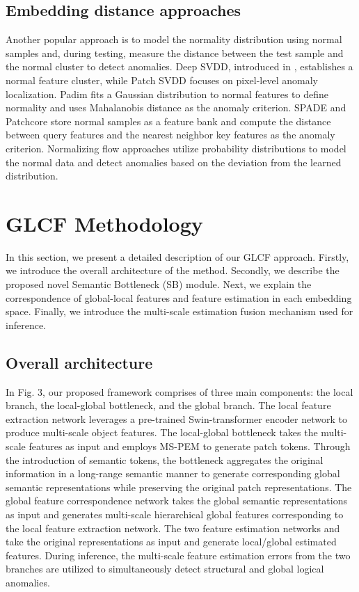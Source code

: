 \documentclass[lettersize,journal]{IEEEtran}
\begin{document}
\subsection{Embedding distance approaches}
Another popular approach is to model the normality distribution using normal samples and, during testing, measure the distance between the test sample and the normal cluster to detect anomalies. Deep SVDD, introduced in \cite{r18}, establishes a normal feature cluster, while Patch SVDD \cite{r19} focuses on pixel-level anomaly localization. Padim \cite{r23} fits a Gaussian distribution to normal features to define normality and uses Mahalanobis distance as the anomaly criterion. SPADE \cite{r21} and Patchcore \cite{r22} store normal samples as a feature bank and compute the distance between query features and the nearest neighbor key features as the anomaly criterion. Normalizing flow approaches \cite{r25, r24} utilize probability distributions to model the normal data and detect anomalies based on the deviation from the learned distribution.

\section{GLCF Methodology}

In this section, we present a detailed description of our GLCF approach. Firstly, we introduce the overall architecture of the method. Secondly, we describe the proposed novel Semantic Bottleneck (SB) module. Next, we explain the correspondence of global-local features and feature estimation in each embedding space. Finally, we introduce the multi-scale estimation fusion mechanism used for inference.



\subsection{Overall architecture}

In Fig. 3, our proposed framework comprises of three main components: the local branch, the local-global bottleneck, and the global branch. The local feature extraction network  leverages a pre-trained Swin-transformer \cite{r30} encoder network to produce multi-scale object features. The local-global bottleneck takes the multi-scale features as input and employs MS-PEM to generate patch tokens. Through the introduction of semantic tokens, the bottleneck aggregates the original information in a long-range semantic manner to generate corresponding global semantic representations while preserving the original patch representations. The global feature correspondence network  takes the global semantic representations as input and generates multi-scale hierarchical global features corresponding to the local feature extraction network. The two feature estimation networks  and  take the original representations as input and generate local/global estimated features. During inference, the multi-scale feature estimation errors from the two branches are utilized to simultaneously detect structural and global logical anomalies.
\end{document}

